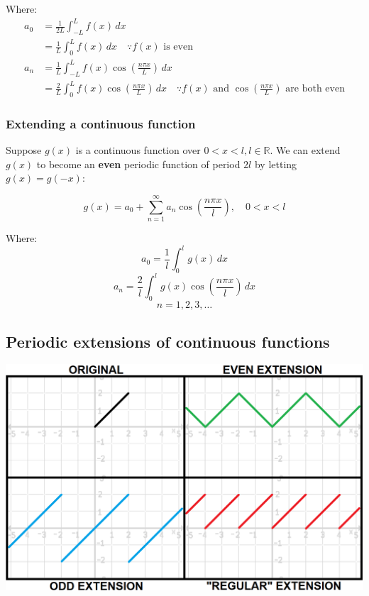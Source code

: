 \documentclass[11pt]{article}
\begin{document}
Where:
\begin{align*}
a_0 &= \frac{1}{2L} \int_{-L}^{L} f(x) \, dx \\
&= \frac{1}{L} \int_0^L f(x) \, dx \quad \because f(x) \text{ is even} \\
a_n &= \frac{1}{L} \int_{-L}^{L} f(x) \cos \left( \frac{n \pi x}{L} \right) \, dx \\
&= \frac{2}{L} \int_0^L f(x) \cos \left( \frac{n \pi x}{L} \right) \, dx \quad \because f(x) \text{ and } \cos \left( \frac{n \pi x}{L} \right) \text{ are both even}
\end{align*}

\subsubsection{Extending a continuous function}
\label{sec:org091fc8b}
Suppose \(g(x)\) is a continuous function over \(0 < x < l, l \in \mathbb{R}\). We can extend \(g(x)\) to become an \textbf{even} periodic function of period \(2l\) by letting \(g(x) = g(-x)\):

\[g(x) = a_0 + \sum_{n = 1}^{\infty} a_n \cos \left( \frac{n \pi x}{l} \right), \quad 0 < x < l\]

Where:
\[a_0 = \frac{1}{l} \int_0^l g(x) \, dx\]
\[a_n = \frac{2}{l} \int_0^l g(x) \cos \left( \frac{n \pi x}{l} \right) \, dx\]
\[n = 1, 2, 3, \ldots\]

 \newpage

\subsection{Periodic extensions of continuous functions}
\label{sec:orgff1db93}
\begin{center}
\includegraphics[width=.9\linewidth]{./images/function-extensions.png}
\end{center}
\end{document}
